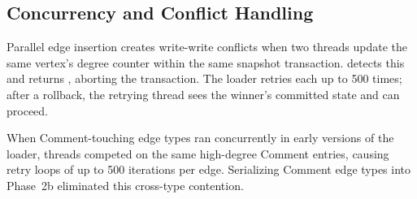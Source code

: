 \subsection{Concurrency and Conflict Handling}
\label{arch:prop-bulk:concurrency}

Parallel edge insertion creates write-write conflicts when two threads update the same vertex's degree counter within the same \wt{} snapshot transaction.
\wt{} detects this and returns , aborting the transaction.
The loader retries each  up to 500 times; after a rollback, the retrying thread sees the winner's committed state and can proceed.

When Comment-touching edge types ran concurrently in early versions of the loader, threads competed on the same high-degree Comment entries, causing retry loops of up to 500 iterations per edge.
Serializing Comment edge types into Phase~2b eliminated this cross-type contention.
